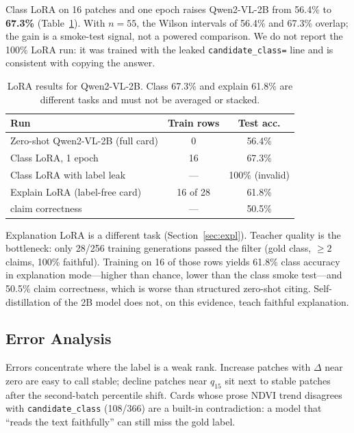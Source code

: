 \documentclass[11pt]{article}
\begin{document}
Class LoRA on 16 patches and one epoch raises Qwen2-VL-2B from 56.4\%
to \textbf{67.3\%} (Table~\ref{tab:lora}). With $n=55$, the Wilson
intervals of 56.4\% and 67.3\% overlap; the gain is a smoke-test
signal, not a powered comparison. We do not report the 100\% LoRA
run: it was trained with the leaked \texttt{candidate\_class=} line
and is consistent with copying the answer.

\begin{table}[t]
\centering
\small
\begin{tabular}{lcc}
\toprule
Run & Train rows & Test acc. \\
\midrule
Zero-shot Qwen2-VL-2B (full card) & 0 & 56.4\% \\
Class LoRA, 1 epoch & 16 & 67.3\% \\
Class LoRA with label leak & --- & 100\% (invalid) \\
\midrule
Explain LoRA (label-free card) & 16 of 28 & 61.8\% \\
\quad claim correctness & --- & 50.5\% \\
\bottomrule
\end{tabular}
\caption{LoRA results for Qwen2-VL-2B. Class 67.3\% and explain
61.8\% are different tasks and must not be averaged or stacked.}
\label{tab:lora}
\end{table}

Explanation LoRA is a different task (Section~\ref{sec:expl}).
Teacher quality is the bottleneck: only 28/256 training generations
passed the filter (gold class, $\ge 2$ claims, 100\% faithful).
Training on 16 of those rows yields 61.8\% class accuracy in
explanation mode---higher than chance, lower than the class smoke
test---and 50.5\% claim correctness, which is worse than structured
zero-shot citing. Self-distillation of the 2B model does not, on
this evidence, teach faithful explanation.

\subsection{Error Analysis}

Errors concentrate where the label is a weak rank. Increase patches
with $\Delta$ near zero are easy to call stable; decline patches
near $q_{15}$ sit next to stable patches after the second-batch
percentile shift. Cards whose prose NDVI trend disagrees with
\texttt{candidate\_class} (108/366) are a built-in contradiction:
a model that ``reads the text faithfully'' can still miss the gold
label.
\end{document}
